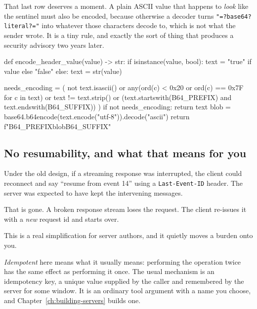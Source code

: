 That last row deserves a moment. A plain ASCII value that happens to \emph{look}
like the sentinel must also be encoded, because otherwise a decoder turns
\texttt{"=?base64?literal?="} into whatever those characters decode to, which is
not what the sender wrote. It is a tiny rule, and exactly the sort of thing that
produces a security advisory two years later.

\begin{py}
def encode_header_value(value) -> str:
    if isinstance(value, bool):
        text = "true" if value else "false"
    else:
        text = str(value)

    needs_encoding = (
        not text.isascii()
        or any(ord(c) < 0x20 or ord(c) == 0x7F for c in text)
        or text != text.strip()
        or (text.startswith(B64_PREFIX) and text.endswith(B64_SUFFIX))
    )
    if not needs_encoding:
        return text
    blob = base64.b64encode(text.encode("utf-8")).decode("ascii")
    return f"{B64_PREFIX}{blob}{B64_SUFFIX}"
\end{py}

\subsection{No resumability, and what that means for you}

Under the old design, if a streaming response was interrupted, the client could
reconnect and say ``resume from event 14'' using a \texttt{Last-Event-ID}
header. The server was expected to have kept the intervening messages.

That is gone. A broken response stream loses the request. The client re-issues
it with a \emph{new} request id and starts over.

This is a real simplification for server authors, and it quietly moves a burden
onto you.


\emph{Idempotent} here means what it usually means: performing the operation
twice has the same effect as performing it once. The usual mechanism is an
idempotency key, a unique value supplied by the caller and remembered by the
server for some window. It is an ordinary tool argument with a name you choose,
and Chapter~\ref{ch:building-servers} builds one.

